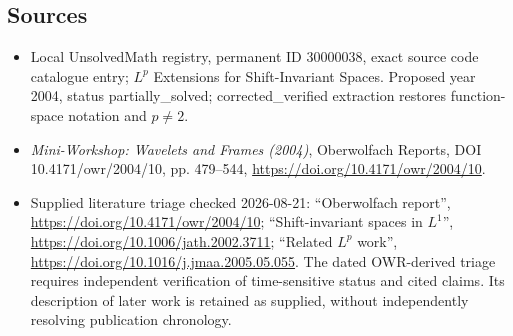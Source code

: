 \documentclass[11pt]{article}
\begin{document}
\subsection{Sources}
\begin{itemize}
\item Local UnsolvedMath registry, permanent ID 30000038, exact source code catalogue entry; $L^p$ Extensions for Shift-Invariant Spaces. Proposed year 2004, status partially\_solved; corrected\_verified extraction restores function-space notation and $p\ne2$.
\item \emph{Mini-Workshop: Wavelets and Frames (2004)}, Oberwolfach Reports, DOI 10.4171/owr/2004/10, pp. 479--544, \url{https://doi.org/10.4171/owr/2004/10}.
\item Supplied literature triage checked 2026-08-21: ``Oberwolfach report'', \url{https://doi.org/10.4171/owr/2004/10}; ``Shift-invariant spaces in $L^1$'', \url{https://doi.org/10.1006/jath.2002.3711}; ``Related $L^p$ work'', \url{https://doi.org/10.1016/j.jmaa.2005.05.055}. The dated OWR-derived triage requires independent verification of time-sensitive status and cited claims. Its description of later work is retained as supplied, without independently resolving publication chronology.
\end{itemize}
\end{document}
